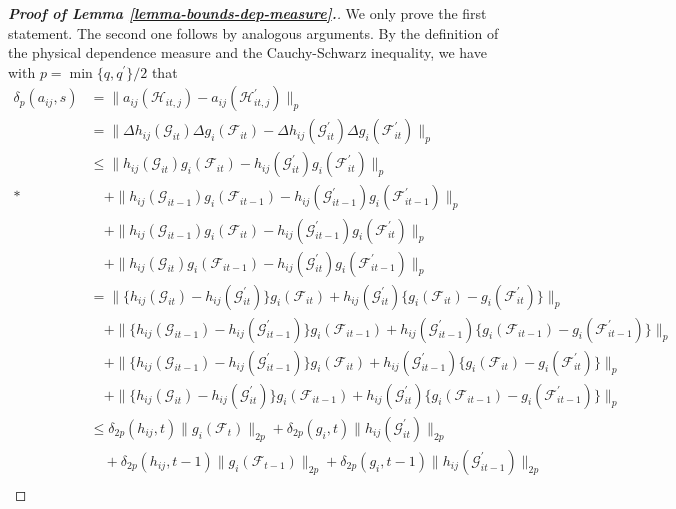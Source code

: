 \documentclass[12pt]{article}
\begin{document}
\begin{proof}[\textnormal{\textbf{Proof of Lemma \ref{lemma-bounds-dep-measure}.}}]
We only prove the first statement. The second one follows by analogous arguments. By the definition of the physical dependence measure and the Cauchy-Schwarz inequality, we have with $p = \min\{q,q^\prime\}/2$ that
\begin{align*}
\delta_p(a_{ij}, s) 
 & = \| a_{ij}(\mathcal{H}_{it,j}) - a_{ij}(\mathcal{H}_{it,j}^\prime) \|_p \\
 &= \| \Delta h_{ij}(\mathcal{G}_{it}) \Delta g_i(\mathcal{F}_{it}) -  \Delta h_{ij}(\mathcal{G}_{it}^\prime) \Delta g_i(\mathcal{F}_{it}^\prime) \|_p \\
 &\leq \| h_{ij}(\mathcal{G}_{it}) g_i(\mathcal{F}_{it}) - h_{ij}(\mathcal{G}_{it}^\prime) g_i(\mathcal{F}_{it}^\prime) \|_p \\*
 &\quad + \| h_{ij}(\mathcal{G}_{it-1}) g_i(\mathcal{F}_{it-1}) - h_{ij}(\mathcal{G}_{it-1}^\prime) g_i(\mathcal{F}_{it-1}^\prime) \|_p \\
 &\quad + \| h_{ij}(\mathcal{G}_{it-1}) g_i(\mathcal{F}_{it}) - h_{ij}(\mathcal{G}_{it-1}^\prime) g_i(\mathcal{F}_{it}^\prime) \|_p \\
 &\quad + \| h_{ij}(\mathcal{G}_{it}) g_i(\mathcal{F}_{it-1}) - h_{ij}(\mathcal{G}_{it}^\prime) g_i(\mathcal{F}_{it-1}^\prime) \|_p \\
 & = \| \{ h_{ij}(\mathcal{G}_{it}) - h_{ij}(\mathcal{G}_{it}^\prime)\} g_i(\mathcal{F}_{it}) + h_{ij}(\mathcal{G}_{it}^\prime) \{g_i(\mathcal{F}_{it}) - g_i(\mathcal{F}_{it}^\prime)\} \|_p \\
 & \quad + \| \{ h_{ij}(\mathcal{G}_{it-1}) - h_{ij}(\mathcal{G}_{it-1}^\prime)\} g_i(\mathcal{F}_{it-1}) + h_{ij}(\mathcal{G}_{it-1}^\prime) \{g_i(\mathcal{F}_{it-1}) - g_i(\mathcal{F}_{it-1}^\prime)\} \|_p \\
 &\quad + \| \{ h_{ij}(\mathcal{G}_{it-1}) - h_{ij}(\mathcal{G}_{it-1}^\prime)\} g_i(\mathcal{F}_{it}) + h_{ij}(\mathcal{G}_{it-1}^\prime) \{g_i(\mathcal{F}_{it}) - g_i(\mathcal{F}_{it}^\prime)\} \|_p \\
 &\quad + \| \{ h_{ij}(\mathcal{G}_{it}) - h_{ij}(\mathcal{G}_{it}^\prime)\} g_i(\mathcal{F}_{it-1}) + h_{ij}(\mathcal{G}_{it}^\prime) \{g_i(\mathcal{F}_{it-1}) - g_i(\mathcal{F}_{it-1}^\prime)\} \|_p \\
 &\leq \delta_{2p}(h_{ij}, t) \| g_i(\mathcal{F}_t) \|_{2p} + \delta_{2p} (g_i, t) \| h_{ij}(\mathcal{G}_{it}^\prime) \|_{2p} \\
&\quad + \delta_{2p}(h_{ij}, t-1) \| g_i(\mathcal{F}_{t-1}) \|_{2p} + \delta_{2p} (g_i, t-1) \| h_{ij}(\mathcal{G}_{it-1}^\prime) \|_{2p} \\

\end{align*}
\end{proof}
\end{document}
